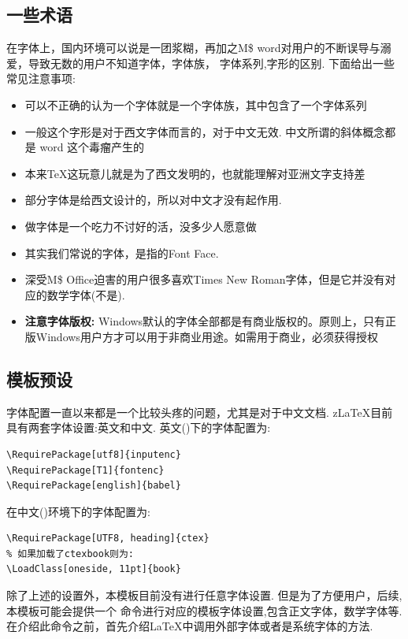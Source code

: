 \subsection{一些术语}
在字体上，国内环境可以说是一团浆糊，再加之M\$ word对用户的不断误导与溺爱，导致无数的用户不知道字体，字体族，
字体系列,字形的区别. 下面给出一些常见注意事项:
\begin{itemize}
    \item 可以不正确的认为一个字体就是一个字体族，其中包含了一个字体系列
    \item 一般这个字形是对于西文字体而言的，对于中文无效. 中文所谓的斜体概念都是 word 这个毒瘤产生的
    \item 本来\TeX{}这玩意儿就是为了西文发明的，也就能理解对亚洲文字支持差
    \item 部分字体是给西文设计的，所以对中文才没有起作用.
    \item 做字体是一个吃力不讨好的活，没多少人愿意做
    \item 其实我们常说的字体，是指的Font Face.
    \item 深受M\$ Office迫害的用户很多喜欢Times New Roman字体，但是它并没有对应的数学字体(不是).
    \item \textbf{注意字体版权:} Windows默认的字体全部都是有商业版权的。原则上，只有正版Windows用户方才可以用于非商业用途。如需用于商业，必须获得授权
\end{itemize} 

\subsection{模板预设}
字体配置一直以来都是一个比较头疼的问题，尤其是对于中文文档. z\LaTeX{}目前具有两套字体设置:英文和中文.
英文()下的字体配置为:
\begin{verbatim}
\RequirePackage[utf8]{inputenc}
\RequirePackage[T1]{fontenc}
\RequirePackage[english]{babel} 
\end{verbatim}

在中文()环境下的字体配置为:
\begin{verbatim}
\RequirePackage[UTF8, heading]{ctex}
% 如果加载了ctexbook则为:
\LoadClass[oneside, 11pt]{book}
\end{verbatim}

除了上述的设置外，本模板目前没有进行任意字体设置. 但是为了方便用户，后续,本模板可能会提供一个
\cmd{\zlatexFontSetup}\index{\cmd{\zlatexFontSetup}}命令进行对应的模板字体设置,包含正文字体，数学字体等. 
在介绍此命令之前，首先介绍\LaTeX{}中调用外部字体或者是系统字体的方法.


